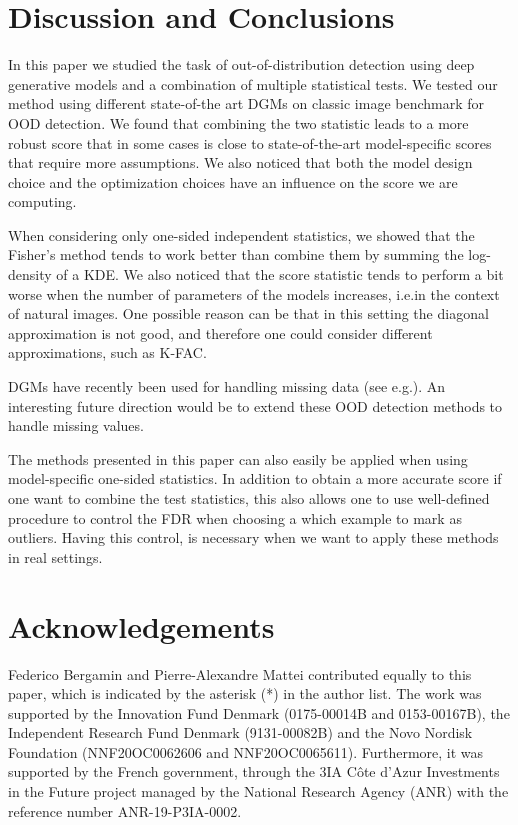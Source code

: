 {%
\section{Discussion and Conclusions}
In this paper we studied the task of out-of-distribution detection using deep generative models and a combination of multiple statistical tests. We tested our method using different state-of-the art DGMs on classic image benchmark for OOD detection. We found that combining the two statistic leads to a more robust score that in some cases is close to state-of-the-art model-specific scores that require more assumptions. We also noticed that both the model design choice and the optimization choices have an influence on the score we are computing. 

When considering only one-sided independent statistics, we showed that the Fisher's method tends to work better than combine them by summing the log-density of a KDE. We also noticed that the score statistic tends to perform a bit worse when the number of parameters of the models increases, i.e.\@ in the context of natural images. One possible reason can be that in this setting the diagonal approximation is not good, and therefore one could consider different approximations, such as K-FAC. 

DGMs have recently been used for handling missing data (see e.g.\@ \citealp{mattei_miwae_2019, ma_eddi_2019, nazabal_handling_2020, ipsen_not-miwae_2021}). An interesting future direction would be to extend these OOD detection methods to handle missing values.

The methods  presented in this paper can also easily be applied when using model-specific one-sided statistics. In addition to obtain a more accurate score if one want to combine the test statistics, this also allows one to use well-defined procedure to control the FDR when choosing a which example to mark as outliers. Having this control, is necessary when we want to apply these methods in real settings. 


\section*{Acknowledgements}
Federico Bergamin and Pierre-Alexandre Mattei contributed equally to this paper, which is indicated by the asterisk (*) in the author list. The work was supported by the Innovation Fund Denmark (0175-00014B and 0153-00167B), the Independent Research Fund Denmark (9131-00082B) and the Novo Nordisk Foundation (NNF20OC0062606 and NNF20OC0065611). Furthermore, it was supported by the French government, through the 3IA Côte d'Azur Investments in the Future project managed by the National Research Agency (ANR) with the reference number ANR-19-P3IA-0002.


}